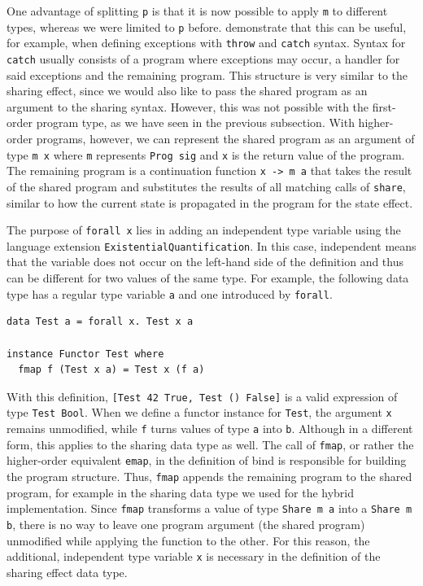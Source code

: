 \documentclass[a4paper, 11pt, fleqn, twoside, abstract=on]{scrreprt}
\newcommand{\hinl}[1]{\texttt{#1}}
\begin{document}
One advantage of splitting \hinl{p} is that it is now possible to apply \hinl{m} to different types, whereas we were limited to \hinl{p} before.
\citet{wu2014effect} demonstrate that this can be useful, for example, when defining exceptions with \hinl{throw} and \hinl{catch} syntax.
Syntax for \hinl{catch} usually consists of a program where exceptions may occur, a handler for said exceptions and the remaining program.
This structure is very similar to the sharing effect, since we would also like to pass the shared program as an argument to the sharing syntax.
However, this was not possible with the first-order program type, as we have seen in the previous subsection.
With higher-order programs, however, we can represent the shared program as an argument of type \hinl{m x} where \hinl{m} represents \hinl{Prog sig} and \hinl{x} is the return value of the program.
The remaining program is a continuation function \hinl{x -> m a} that takes the result of the shared program and substitutes the results of all matching calls of \hinl{share}, similar to how the current state is propagated in the program for the state effect.

The purpose of \hinl{forall x} lies in adding an independent type variable using the language extension \hinl{ExistentialQuantification}.
In this case, independent means that the variable does not occur on the left-hand side of the definition and thus can be different for two values of the same type.
For example, the following data type has a regular type variable \hinl{a} and one introduced by \hinl{forall}.

\begin{verbatim}
data Test a = forall x. Test x a

instance Functor Test where
  fmap f (Test x a) = Test x (f a)
\end{verbatim}
\noindent
With this definition, \hinl{[Test 42 True, Test () False]} is a valid expression of type \hinl{Test Bool}.
When we define a functor instance for \hinl{Test}, the argument \hinl{x} remains unmodified, while \hinl{f} turns values of type \hinl{a} into \hinl{b}.
Although in a different form, this applies to the sharing data type as well.
The call of \hinl{fmap}, or rather the higher-order equivalent \hinl{emap}, in the definition of bind is responsible for building the program structure.
Thus, \hinl{fmap} appends the remaining program to the shared program, for example in the sharing data type we used for the hybrid implementation.
Since \hinl{fmap} transforms a value of type \hinl{Share m a} into a \hinl{Share m b}, there is no way to leave one program argument (the shared program) unmodified while applying the function to the other.
For this reason, the additional, independent type variable \hinl{x} is necessary in the definition of the sharing effect data type.
\end{document}

